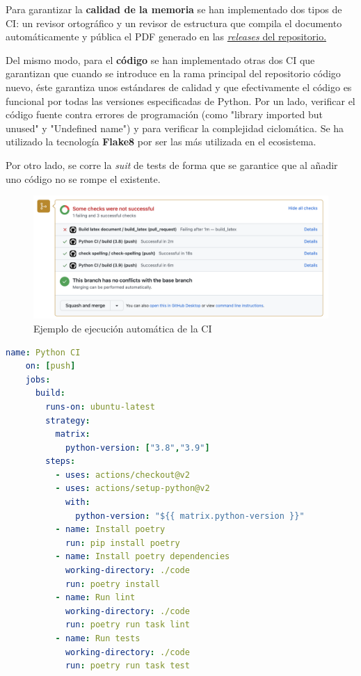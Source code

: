 Para garantizar la \textbf{calidad de la memoria} se han implementado dos tipos de CI: un revisor ortográfico y un revisor de estructura que compila el documento automáticamente y pública el PDF generado en las \href{https://github.com/pablojjimenez/TFG/releases}{\textit{releases} del repositorio.}

Del mismo modo, para el \textbf{código} se han implementado otras dos CI que garantizan que cuando se introduce en la rama principal del repositorio código nuevo, éste garantiza unos estándares de calidad y que efectivamente el código es funcional por todas las versiones especificadas de Python. Por un lado, verificar el código fuente contra errores de programación (como "library imported but unused" y "Undefined name") y para verificar la complejidad ciclomática. Se ha utilizado la tecnología \textbf{Flake8} por ser las más utilizada en el ecosistema.

Por otro lado, se corre la \textit{suit} de tests de forma que se garantice que al añadir uno código no se rompe el existente. 

\FloatBarrier
\begin{figure}[h]
	\centering	
	\includegraphics[width=\textwidth]{doc/logos/imgs/CI-pr.png}
    \caption{Ejemplo de ejecución automática de la CI}
    \label{fig:tipos-de-cc}
\end{figure}
\FloatBarrier

\begin{lstlisting}[language=YAML, caption=Definición de las etapas de la CI del código del proyecto ]
    name: Python CI
    on: [push]
    jobs:
      build:
        runs-on: ubuntu-latest
        strategy:
          matrix:
            python-version: ["3.8","3.9"]
        steps:
          - uses: actions/checkout@v2
          - uses: actions/setup-python@v2
            with:
              python-version: "${{ matrix.python-version }}"
          - name: Install poetry
            run: pip install poetry
          - name: Install poetry dependencies
            working-directory: ./code
            run: poetry install
          - name: Run lint
            working-directory: ./code
            run: poetry run task lint
          - name: Run tests
            working-directory: ./code
            run: poetry run task test
\end{lstlisting}

